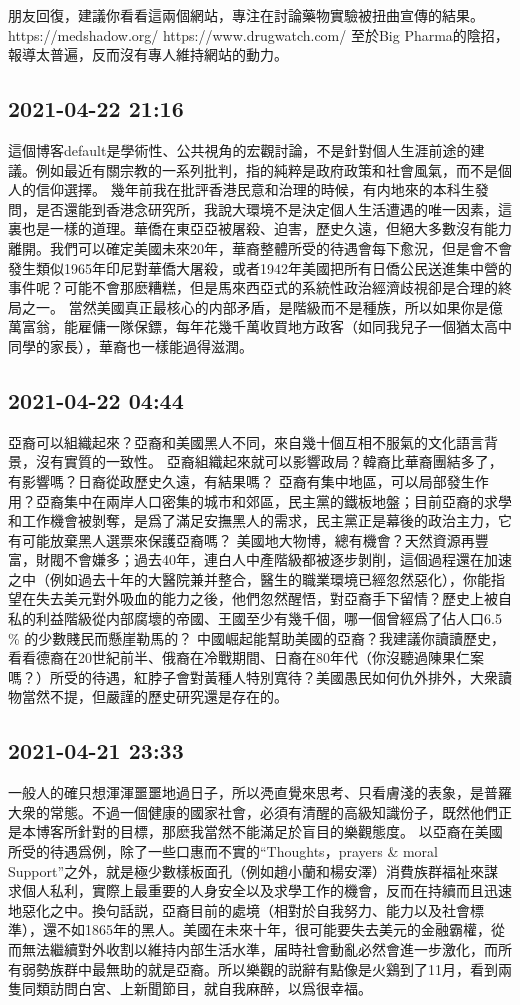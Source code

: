 \documentclass[twocolumn]{ctexart}
\begin{document}
朋友回復，建議你看看這兩個網站，專注在討論藥物實驗被扭曲宣傳的結果。
https://medshadow.org/
https://www.drugwatch.com/
至於Big Pharma的陰招，報導太普遍，反而沒有專人維持網站的動力。
\subsection*{2021-04-22 21:16}

這個博客default是學術性、公共視角的宏觀討論，不是針對個人生涯前途的建議。例如最近有關宗教的一系列批判，指的純粹是政府政策和社會風氣，而不是個人的信仰選擇。
幾年前我在批評香港民意和治理的時候，有内地來的本科生發問，是否還能到香港念研究所，我說大環境不是決定個人生活遭遇的唯一因素，這裏也是一樣的道理。華僑在東亞亞被屠殺、迫害，歷史久遠，但絕大多數沒有能力離開。我們可以確定美國未來20年，華裔整體所受的待遇會每下愈況，但是會不會發生類似1965年印尼對華僑大屠殺，或者1942年美國把所有日僑公民送進集中營的事件呢？可能不會那麽糟糕，但是馬來西亞式的系統性政治經濟歧視卻是合理的終局之一。
當然美國真正最核心的内部矛盾，是階級而不是種族，所以如果你是億萬富翁，能雇傭一隊保鏢，每年花幾千萬收買地方政客（如同我兒子一個猶太高中同學的家長），華裔也一樣能過得滋潤。
\subsection*{2021-04-22 04:44}

亞裔可以組織起來？亞裔和美國黑人不同，來自幾十個互相不服氣的文化語言背景，沒有實質的一致性。
亞裔組織起來就可以影響政局？韓裔比華裔團結多了，有影響嗎？日裔從政歷史久遠，有結果嗎？
亞裔有集中地區，可以局部發生作用？亞裔集中在兩岸人口密集的城市和郊區，民主黨的鐵板地盤；目前亞裔的求學和工作機會被剝奪，是爲了滿足安撫黑人的需求，民主黨正是幕後的政治主力，它有可能放棄黑人選票來保護亞裔嗎？
美國地大物博，總有機會？天然資源再豐富，財閥不會嫌多；過去40年，連白人中產階級都被逐步剝削，這個過程還在加速之中（例如過去十年的大醫院兼并整合，醫生的職業環境已經忽然惡化），你能指望在失去美元對外吸血的能力之後，他們忽然醒悟，對亞裔手下留情？歷史上被自私的利益階級從内部腐壞的帝國、王國至少有幾千個，哪一個曾經爲了佔人口6.5 \% 的少數賤民而懸崖勒馬的？
中國崛起能幫助美國的亞裔？我建議你讀讀歷史，看看德裔在20世紀前半、俄裔在冷戰期間、日裔在80年代（你沒聽過陳果仁案嗎？）所受的待遇，紅脖子會對黃種人特別寬待？美國愚民如何仇外排外，大衆讀物當然不提，但嚴謹的歷史研究還是存在的。
\subsection*{2021-04-21 23:33}

一般人的確只想渾渾噩噩地過日子，所以凴直覺來思考、只看膚淺的表象，是普羅大衆的常態。不過一個健康的國家社會，必須有清醒的高級知識份子，既然他們正是本博客所針對的目標，那麽我當然不能滿足於盲目的樂觀態度。
以亞裔在美國所受的待遇爲例，除了一些口惠而不實的“Thoughts，prayers \& moral Support”之外，就是極少數樣板面孔（例如趙小蘭和楊安澤）消費族群福祉來謀求個人私利，實際上最重要的人身安全以及求學工作的機會，反而在持續而且迅速地惡化之中。換句話説，亞裔目前的處境（相對於自我努力、能力以及社會標準），還不如1865年的黑人。美國在未來十年，很可能要失去美元的金融霸權，從而無法繼續對外收割以維持内部生活水準，届時社會動亂必然會進一步激化，而所有弱勢族群中最無助的就是亞裔。所以樂觀的説辭有點像是火鷄到了11月，看到兩隻同類訪問白宮、上新聞節目，就自我麻醉，以爲很幸福。
\end{document}
